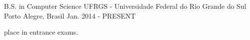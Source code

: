 \begin{cventries}
  \cventry
    {B.S. in Computer Science}
    {UFRGS - Universidade Federal do Rio Grande do Sul}
    {Porto Alegre, Brasil}
    {Jan. 2014 - PRESENT}
    {
      \begin{cvitems}
        \item { place in entrance exams.}
      \end{cvitems}
    }
\end{cventries}

%
